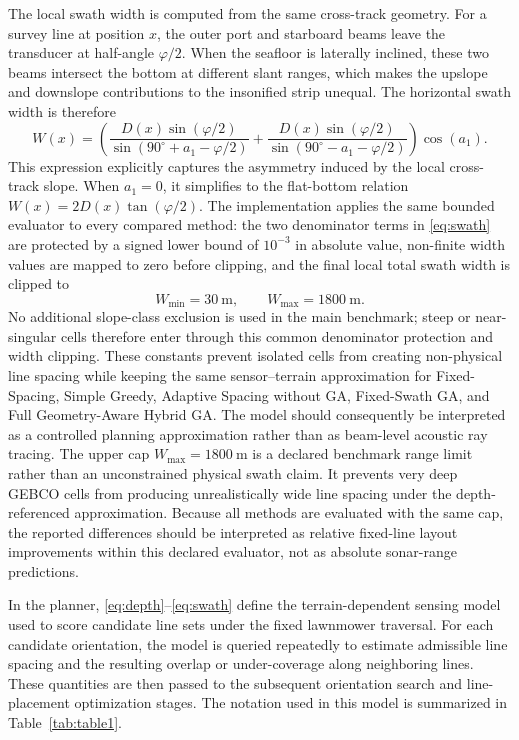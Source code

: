 \documentclass[jmse,article,submit,moreauthors]{Definitions/mdpi}
\begin{document}
The local swath width is computed from the same cross-track geometry. For a survey line at position $x$, the outer port and starboard beams leave the transducer at half-angle $\varphi/2$. When the seafloor is laterally inclined, these two beams intersect the bottom at different slant ranges, which makes the upslope and downslope contributions to the insonified strip unequal. The horizontal swath width is therefore
\begin{equation}
W(x) = \left( \frac{D(x) \sin(\varphi/2)}{\sin(90^{\circ} + a_1 - \varphi/2)} + \frac{D(x) \sin(\varphi/2)}{\sin(90^{\circ} - a_1 - \varphi/2)} \right) \cos(a_1).
\label{eq:swath}
\end{equation}
This expression explicitly captures the asymmetry induced by the local cross-track slope. When $a_1=0$, it simplifies to the flat-bottom relation $W(x)=2D(x)\tan(\varphi/2)$. The implementation applies the same bounded evaluator to every compared method: the two denominator terms in \eqref{eq:swath} are protected by a signed lower bound of \(10^{-3}\) in absolute value, non-finite width values are mapped to zero before clipping, and the final local total swath width is clipped to
\[
W_{\min}=30~\mathrm{m}, \qquad W_{\max}=1800~\mathrm{m}.
\]
No additional slope-class exclusion is used in the main benchmark; steep or near-singular cells therefore enter through this common denominator protection and width clipping. These constants prevent isolated cells from creating non-physical line spacing while keeping the same sensor--terrain approximation for Fixed-Spacing, Simple Greedy, Adaptive Spacing without GA, Fixed-Swath GA, and Full Geometry-Aware Hybrid GA. The model should consequently be interpreted as a controlled planning approximation rather than as beam-level acoustic ray tracing.
The upper cap \(W_{\max}=1800~\mathrm{m}\) is a declared benchmark range limit rather than an unconstrained physical swath claim. It prevents very deep GEBCO cells from producing unrealistically wide line spacing under the depth-referenced approximation. Because all methods are evaluated with the same cap, the reported differences should be interpreted as relative fixed-line layout improvements within this declared evaluator, not as absolute sonar-range predictions.

In the planner, \eqref{eq:depth}--\eqref{eq:swath} define the terrain-dependent sensing model used to score candidate line sets under the fixed lawnmower traversal. For each candidate orientation, the model is queried repeatedly to estimate admissible line spacing and the resulting overlap or under-coverage along neighboring lines. These quantities are then passed to the subsequent orientation search and line-placement optimization stages. The notation used in this model is summarized in Table~\ref{tab:table1}.
\end{document}

